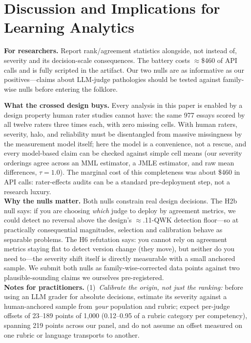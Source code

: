 \documentclass[fleqn,10pt]{JLA_article}
\begin{document}
\section{Discussion and Implications for Learning Analytics}
\label{sec:practice}
\textbf{For researchers.} Report rank/agreement statistics alongside, not instead of, severity and its decision-scale consequences. The battery costs $\approx$\$460 of API calls and is fully scripted in the artifact. Our two nulls are as informative as our positives---claims about LLM-judge pathologies should be tested against family-wise nulls before entering the folklore.

\textbf{What the crossed design buys.} Every analysis in this paper is enabled by a design property human rater studies cannot have: the same 977 essays scored by all twelve raters three times each, with zero missing cells. With human raters, severity, halo, and reliability must be disentangled from massive missingness by the measurement model itself; here the model is a convenience, not a rescue, and every model-based claim can be checked against simple cell means (our severity orderings agree across an MML estimator, a JMLE estimator, and raw mean differences, $\tau = 1.0$). The marginal cost of this completeness was about \$460 in API calls: rater-effects audits can be a standard pre-deployment step, not a research luxury.\\[4pt]
\textbf{Why the nulls matter.} Both nulls constrain real design decisions. The H2b null says: if you are choosing \emph{which} judge to deploy by agreement metrics, we could detect no reversal above the design's $\approx$.11-QWK detection floor---so at practically consequential magnitudes, selection and calibration behave as separable problems. The H6 refutation says: you cannot rely on agreement metrics staying flat to detect version change (they move), but neither do you need to---the severity shift itself is directly measurable with a small anchored sample. We submit both nulls as family-wise-corrected data points against two plausible-sounding claims we ourselves pre-registered.\\[4pt]
\textbf{Notes for practitioners.} (1)~\emph{Calibrate the origin, not just the ranking:} before
using an LLM grader for absolute decisions, estimate its severity against a human-anchored sample
from \emph{your} population and rubric; expect per-judge offsets of 23--189 points of 1{,}000 (0.12--0.95 of a rubric category per competency), spanning 219 points across our panel, and do
not assume an offset measured on one rubric or language transports to another.
\end{document}
